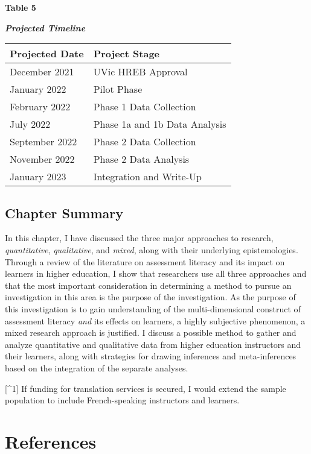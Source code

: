 \documentclass[
]{book}
\begin{document}
\textbf{Table 5}

\textbf{\emph{Projected Timeline}}

\begin{longtable}[]{@{}ll@{}}
\toprule
Projected Date & Project Stage \\
\midrule
\endhead
December 2021 & UVic HREB Approval \\
January 2022 & Pilot Phase \\
February 2022 & Phase 1 Data Collection \\
July 2022 & Phase 1a and 1b Data Analysis \\
September 2022 & Phase 2 Data Collection \\
November 2022 & Phase 2 Data Analysis \\
January 2023 & Integration and Write-Up \\
\bottomrule
\end{longtable}

\hypertarget{chapter-summary}{%
\section{Chapter Summary}\label{chapter-summary}}

In this chapter, I have discussed the three major approaches to research, \emph{quantitative}, \emph{qualitative}, and \emph{mixed}, along with their underlying epistemologies. Through a review of the literature on assessment literacy and its impact on learners in higher education, I show that researchers use all three approaches and that the most important consideration in determining a method to pursue an investigation in this area is the purpose of the investigation. As the purpose of this investigation is to gain understanding of the multi-dimensional construct of assessment literacy \emph{and} its effects on learners, a highly subjective phenomenon, a mixed research approach is justified. I discuss a possible method to gather and analyze quantitative and qualitative data from higher education instructors and their learners, along with strategies for drawing inferences and meta-inferences based on the integration of the separate analyses.

{[}\^{}1{]} If funding for translation services is secured, I would extend the sample population to include French-speaking instructors and learners.

\hypertarget{references}{%
\chapter{References}\label{references}}
\end{document}
